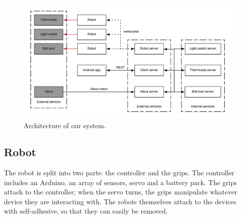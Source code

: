 \documentclass[onecolumn]{IEEEtran}
\begin{document}
\begin{figure}[H]
    \centering
    \includegraphics[width=1.0\linewidth]{images/architecture.png}
    \caption{Architecture of our system.}
\end{figure}

\subsection{Robot}

The robot is split into two parts: the controller and the grips. The controller includes an Arduino, an array of sensors, servo and a battery pack. The grips attach to the controller; when the servo turns, the grips manipulate whatever device they are interacting with. The robots themselves attach to the devices with self-adhesive, so that they can easily be removed.
\end{document}
